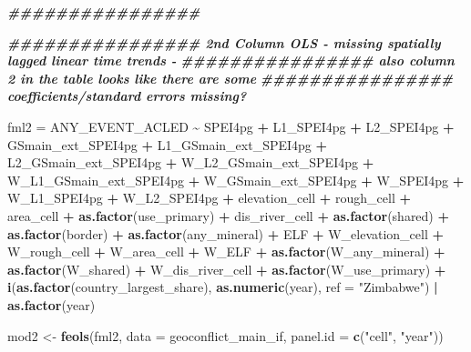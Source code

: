 \documentclass[
  a4paper,
]{article}
\newenvironment{Shaded}{\begin{snugshade}}{\end{snugshade}}
\newcommand{\AttributeTok}[1]{\textcolor[rgb]{0.13,0.29,0.53}{#1}}
\newcommand{\DocumentationTok}[1]{\textcolor[rgb]{0.56,0.35,0.01}{\textbf{\textit{#1}}}}
\newcommand{\FunctionTok}[1]{\textcolor[rgb]{0.13,0.29,0.53}{\textbf{#1}}}
\newcommand{\NormalTok}[1]{#1}
\newcommand{\OtherTok}[1]{\textcolor[rgb]{0.56,0.35,0.01}{#1}}
\newcommand{\SpecialCharTok}[1]{\textcolor[rgb]{0.81,0.36,0.00}{\textbf{#1}}}
\newcommand{\StringTok}[1]{\textcolor[rgb]{0.31,0.60,0.02}{#1}}
\begin{document}
\begin{Shaded}
\begin{Highlighting}[]
\DocumentationTok{\#\#\#\#\#\#\#\#\#\#\#\#\#\#\#\#}


\DocumentationTok{\#\#\#\#\#\#\#\#\#\#\#\#\#\#\#\# 2nd Column OLS {-} missing spatially lagged linear time trends {-}}
\DocumentationTok{\#\#\#\#\#\#\#\#\#\#\#\#\#\#\#\# also column 2 in the table looks like there are some}
\DocumentationTok{\#\#\#\#\#\#\#\#\#\#\#\#\#\#\#\# coefficients/standard errors missing?}

\NormalTok{fml2 }\OtherTok{=}\NormalTok{ ANY\_EVENT\_ACLED }\SpecialCharTok{\textasciitilde{}}\NormalTok{ SPEI4pg }\SpecialCharTok{+}\NormalTok{ L1\_SPEI4pg }\SpecialCharTok{+}\NormalTok{ L2\_SPEI4pg }\SpecialCharTok{+}\NormalTok{ GSmain\_ext\_SPEI4pg }\SpecialCharTok{+}
\NormalTok{    L1\_GSmain\_ext\_SPEI4pg }\SpecialCharTok{+}\NormalTok{ L2\_GSmain\_ext\_SPEI4pg }\SpecialCharTok{+}\NormalTok{ W\_L2\_GSmain\_ext\_SPEI4pg }\SpecialCharTok{+}\NormalTok{ W\_L1\_GSmain\_ext\_SPEI4pg }\SpecialCharTok{+}
\NormalTok{    W\_GSmain\_ext\_SPEI4pg }\SpecialCharTok{+}\NormalTok{ W\_SPEI4pg }\SpecialCharTok{+}\NormalTok{ W\_L1\_SPEI4pg }\SpecialCharTok{+}\NormalTok{ W\_L2\_SPEI4pg }\SpecialCharTok{+}\NormalTok{ elevation\_cell }\SpecialCharTok{+}
\NormalTok{    rough\_cell }\SpecialCharTok{+}\NormalTok{ area\_cell }\SpecialCharTok{+} \FunctionTok{as.factor}\NormalTok{(use\_primary) }\SpecialCharTok{+}\NormalTok{ dis\_river\_cell }\SpecialCharTok{+} \FunctionTok{as.factor}\NormalTok{(shared) }\SpecialCharTok{+}
    \FunctionTok{as.factor}\NormalTok{(border) }\SpecialCharTok{+} \FunctionTok{as.factor}\NormalTok{(any\_mineral) }\SpecialCharTok{+}\NormalTok{ ELF }\SpecialCharTok{+}\NormalTok{ W\_elevation\_cell }\SpecialCharTok{+}\NormalTok{ W\_rough\_cell }\SpecialCharTok{+}
\NormalTok{    W\_area\_cell }\SpecialCharTok{+}\NormalTok{ W\_ELF }\SpecialCharTok{+} \FunctionTok{as.factor}\NormalTok{(W\_any\_mineral) }\SpecialCharTok{+} \FunctionTok{as.factor}\NormalTok{(W\_shared) }\SpecialCharTok{+}\NormalTok{ W\_dis\_river\_cell }\SpecialCharTok{+}
    \FunctionTok{as.factor}\NormalTok{(W\_use\_primary) }\SpecialCharTok{+} \FunctionTok{i}\NormalTok{(}\FunctionTok{as.factor}\NormalTok{(country\_largest\_share), }\FunctionTok{as.numeric}\NormalTok{(year),}
    \AttributeTok{ref =} \StringTok{"Zimbabwe"}\NormalTok{) }\SpecialCharTok{|} \FunctionTok{as.factor}\NormalTok{(year)}

\NormalTok{mod2 }\OtherTok{\textless{}{-}} \FunctionTok{feols}\NormalTok{(fml2, }\AttributeTok{data =}\NormalTok{ geoconflict\_main\_if, }\AttributeTok{panel.id =} \FunctionTok{c}\NormalTok{(}\StringTok{"cell"}\NormalTok{, }\StringTok{"year"}\NormalTok{))}


\end{Highlighting}
\end{Shaded}
\end{document}

